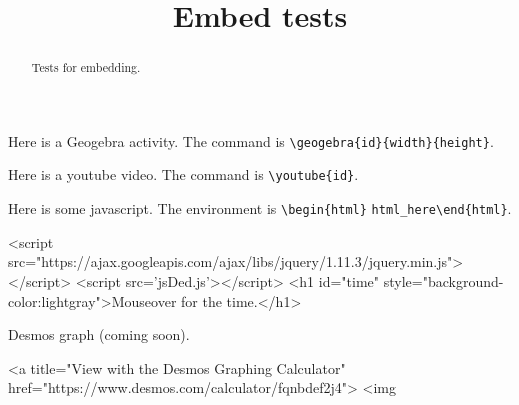 \documentclass{ximera}
\title{Embed tests}
\begin{document}
	
\begin{abstract}
Tests for embedding.
\end{abstract}

\maketitle

Here is a Geogebra activity. The command is \verb!\geogebra{id}{width}{height}!.


Here is a youtube video. The command is \verb!\youtube{id}!.


Here is some javascript. The environment is \verb!\begin{html}! \verb!html_here!\verb!\end{html}!.

\begin{html}
<script src="https://ajax.googleapis.com/ajax/libs/jquery/1.11.3/jquery.min.js"></script>
<script src='jsDed.js'></script>
<h1 id="time" style="background-color:lightgray">Mouseover for the time.</h1>
\end{html}

Desmos graph (coming soon).


\begin{html}
<a title="View with the Desmos Graphing Calculator" href="https://www.desmos.com/calculator/fqnbdef2j4">  <img %
\end{html}
\end{document}
